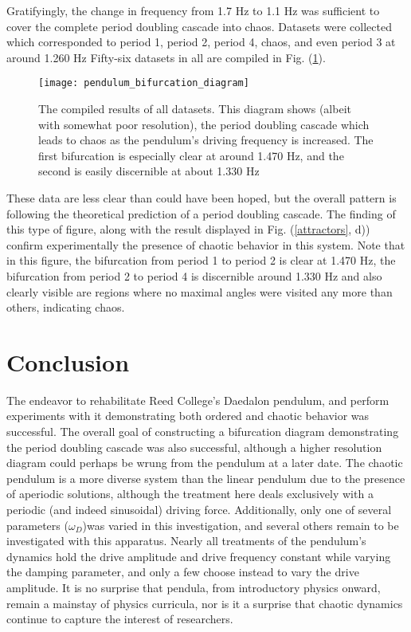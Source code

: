 \documentclass[12pt,twoside]{reedthesis}
\begin{document}
Gratifyingly, the change in frequency from 1.7 Hz  to 1.1 Hz  was sufficient to cover the complete period doubling cascade into chaos.  Datasets were collected which corresponded to period 1, period 2, period 4, chaos, and even period 3 at around 1.260 Hz   Fifty-six datasets in all are compiled in Fig. (\ref{pendulum_bifurcation_diagram}).  

\begin{figure}[h]
\centering
\texttt{[image: pendulum\_bifurcation\_diagram]} 
\caption{The compiled results of all datasets.  This diagram shows (albeit with somewhat poor resolution), the period doubling cascade which leads to chaos as the pendulum's driving frequency is increased.  The first bifurcation is especially clear at around 1.470 Hz, and the second is easily discernible at about 1.330 Hz}
\label{pendulum_bifurcation_diagram}
\end{figure}

These data are less clear than could have been hoped, but the overall pattern is following the theoretical prediction of a period doubling cascade.  The finding of this type of figure, along with the result displayed in Fig. (\ref{attractors}, d)) confirm experimentally the presence of chaotic behavior in this system.  Note that in this figure, the bifurcation from period 1 to period 2 is clear at 1.470 Hz, the bifurcation from period 2 to period 4 is discernible around 1.330 Hz and also clearly visible are regions where no maximal angles were visited any more than others, indicating chaos.  



\chapter*{Conclusion}
	\setcounter{chapter}{4}
	\setcounter{section}{0}

The endeavor to rehabilitate Reed College's Daedalon pendulum, and perform experiments with it demonstrating both ordered and chaotic behavior was successful.  The overall goal of constructing a bifurcation diagram demonstrating the period doubling cascade was also successful, although a higher resolution diagram could perhaps be wrung from the pendulum at a later date.  The chaotic pendulum is a more diverse system than the linear pendulum due to the presence of aperiodic solutions, although the treatment here deals exclusively with a periodic (and indeed sinusoidal) driving force.  Additionally, only one of several parameters ($\omega_D$)was varied in this investigation, and several others remain to be investigated with this apparatus.  Nearly all treatments of the pendulum's dynamics hold the drive amplitude and drive frequency constant while varying the damping parameter, and only a few choose instead to vary the drive amplitude.  It is no surprise that pendula, from introductory physics onward, remain a mainstay of physics curricula, nor is it a surprise that chaotic dynamics continue to capture the interest of researchers.  
\end{document}
